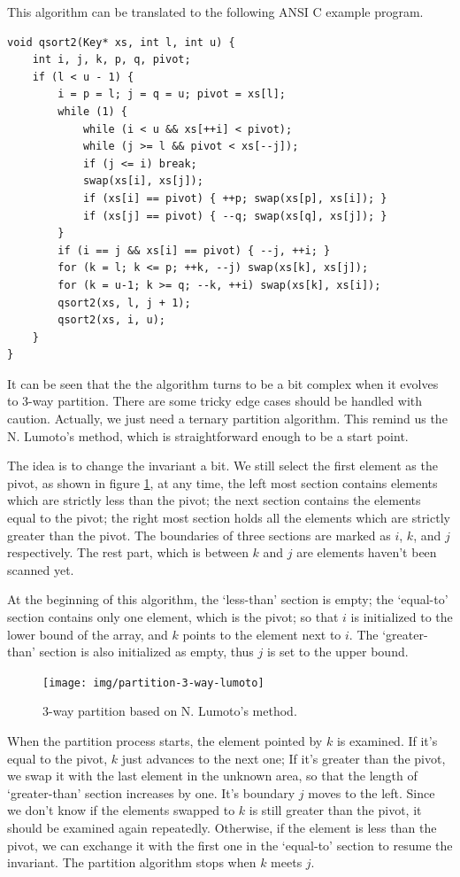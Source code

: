\documentclass[b5paper]{article}
\begin{document}
This algorithm can be translated to the following ANSI C example program.

\lstset{language=C}
\begin{lstlisting}
void qsort2(Key* xs, int l, int u) {
    int i, j, k, p, q, pivot;
    if (l < u - 1) {
        i = p = l; j = q = u; pivot = xs[l];
        while (1) {
            while (i < u && xs[++i] < pivot);
            while (j >= l && pivot < xs[--j]);
            if (j <= i) break;
            swap(xs[i], xs[j]);
            if (xs[i] == pivot) { ++p; swap(xs[p], xs[i]); }
            if (xs[j] == pivot) { --q; swap(xs[q], xs[j]); }
        }
        if (i == j && xs[i] == pivot) { --j, ++i; }
        for (k = l; k <= p; ++k, --j) swap(xs[k], xs[j]);
        for (k = u-1; k >= q; --k, ++i) swap(xs[k], xs[i]);
        qsort2(xs, l, j + 1);
        qsort2(xs, i, u);
    }
}
\end{lstlisting}

It can be seen that the the algorithm turns to be a bit complex when it evolves to 3-way partition.
There are some tricky edge cases should be handled with caution. Actually, we just need a ternary
partition algorithm. This remind us the N. Lumoto's method, which is straightforward enough
to be a start point.

The idea is to change the invariant a bit. We still select the first element as the pivot,
as shown in figure \ref{fig:partition-3-way-lumoto},
at any time, the left most section contains elements which are strictly less than the pivot;
the next section contains the elements equal to the pivot; the right most section holds all the
elements which are strictly greater than the pivot. The boundaries of three sections are marked
as $i$, $k$, and $j$ respectively.
The rest part, which is between $k$ and $j$ are elements haven't been scanned yet.

At the beginning of this algorithm, the `less-than' section is empty; the `equal-to' section
contains only one element, which is the pivot; so that $i$ is initialized to the lower bound
of the array, and $k$ points to the element next to $i$. The `greater-than' section is also
initialized as empty, thus $j$ is set to the upper bound.

\begin{figure}[htbp]
   \centering
   \texttt{[image: img/partition-3-way-lumoto]}
   \caption{3-way partition based on N. Lumoto's method.}
   \label{fig:partition-3-way-lumoto}
\end{figure}

When the partition process starts, the element pointed by $k$ is examined. If it's equal to
the pivot, $k$ just advances to the next one; If it's greater than the pivot, we swap it with
the last element in the unknown area, so that the length of `greater-than' section increases
by one. It's boundary $j$ moves to the left. Since we don't know if the elements swapped to $k$
is still greater than the pivot, it should be examined again repeatedly. Otherwise, if the
element is less than the pivot, we can exchange it with the first one in the `equal-to' section
to resume the invariant. The partition algorithm stops when $k$ meets $j$.
\end{document}

